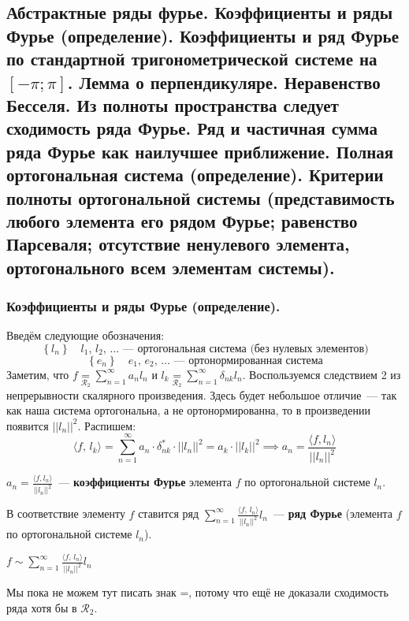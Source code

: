 \subsection{Абстрактные ряды фурье. Коэффициенты и ряды Фурье (определение). Коэффициенты и ряд Фурье по стандартной тригонометрической системе на $[-\pi; \pi]$. Лемма о перпендикуляре. Неравенство Бесселя. Из полноты пространства следует сходимость ряда Фурье. Ряд и частичная сумма ряда Фурье как наилучшее приближение. Полная ортогональная система (определение). Критерии полноты ортогональной системы (представимость любого элемента его рядом Фурье; равенство Парсеваля; отсутствие ненулевого элемента, ортогонального всем элементам системы).}

\subsubsection{Коэффициенты и ряды Фурье (определение). \label{subsubsec:label1}}
Введём следующие обозначения:
\[\left\{ l_n \right\} \quad l_1,\, l_2,\, \ldots\text{~--- ортогональная система (без нулевых элементов)}\]
\[\left\{ e_n \right\} \quad e_1,\, e_2,\, \ldots\text{~--- ортонормированная система}\]
Заметим, что $f \underset{\mathcal{R}_2}{=} \sum_{n=1}^\infty a_n l_n$ и $l_k \underset{\mathcal{R}_2}{=} \sum_{n=1}^\infty \delta_{nk} l_n$. Воспользуемся следствием 2 из непрерывности скалярного произведения. Здесь будет небольшое отличие~--- так как наша система ортогональна, а не ортонормированна, то в произведении появится $\lvert \lvert l_n \rvert \rvert^2$.
Распишем: \[\langle f,\, l_k \rangle = \sum_{n=1}^\infty a_n \cdot \delta_{nk}^*  \cdot \lvert \lvert l_n \rvert \rvert^2 = a_k \cdot \lvert \lvert l_k \rvert \rvert^2 \implies a_n = \frac{\langle f, l_n \rangle}{\lvert \lvert l_n \rvert \rvert^2}\]
\begin{definition*}
    $a_n = \frac{\langle f, l_n \rangle}{\lvert \lvert l_n \rvert \rvert^2}$~--- \textbf{коэффициенты Фурье} элемента $f$ по ортогональной системе $l_n$. 
\end{definition*}

\begin{definition*}
    В соответствие элементу $f$ ставится ряд $\sum_{n=1}^\infty \frac{\langle f,\, l_n \rangle}{\lvert \lvert l_n \rvert \rvert^2} l_n$~--- \textbf{ряд Фурье} (элемента $f$ по ортогональной системе $l_n$).
\end{definition*}
\begin{designation*}
    $f \sim \sum_{n=1}^\infty \frac{\langle f,\, l_n \rangle}{\lvert \lvert l_n \rvert \rvert^2} l_n$
\end{designation*}
Мы пока не можем тут писать знак =, потому что ещё не доказали сходимость ряда хотя бы в $\mathcal{R}_2$.

